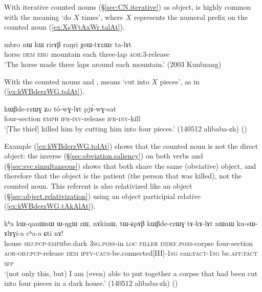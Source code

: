 With iterative counted nouns (§\ref{sec:CN.iterative}) as object,  is highly common with the meaning `do $X$ times', where $X$ represents the numeral prefix on the counted noun  (\ref{ex:XsWtAxWr.talAt}).

\begin{exe}
\ex \label{ex:XsWtAxWr.talAt}
\gll mbro nɯ kɯ rirɤβ raŋri χsɯ-tɤxɯr ta-lɤt \\ 
horse \textsc{dem} \textsc{erg} mountain each three-lap \textsc{aor}:3\flobv{}-release \\
\glt `The horse made three laps around each mountain.' (2003 Kunbzang)
\end{exe}

With the counted nouns  and ,  means `cut into $X$ pieces', as in (\ref{ex:kWBderzWG.tolAt}).

\begin{exe}
\ex \label{ex:kWBderzWG.tolAt}
\gll  kɯβde-rzɯɣ ʑo tó-wɣ-lɤt pjɤ́-wɣ-sat \\
four-section \textsc{emph} \textsc{ifr}-\textsc{inv}-release \textsc{ifr}-\textsc{inv}-kill \\
\glt `[The thief] killed him by cutting him into four pieces.' (140512 alibaba-zh)
()
\end{exe}

Example (\ref{ex:kWBderzWG.tolAt}) shows that the counted noun is not the direct object: the inverse (§\ref{sec:obviation.saliency}) on both verbs  and  (§\ref{sec:svc.simultaneous}) shows that both share the same (obviative) object, and therefore that the object is the patient (the person that was killed), not the counted noun. This referent is also relativized like an object (§\ref{sec:object.relativization}) using an object participial relative (\ref{ex:kWBderzWG.tAkAlAt}).

\begin{exe}
\ex \label{ex:kWBderzWG.tAkAlAt}
\gll kʰa kɯ-qanɯ\redp{}nɯ ɯ-ŋgɯ zɯ, nɤkinɯ, tɯ-ɕpɤβ kɯβde-rzɯɣ tɤ-kɤ-lɤt nɯnɯ ku-sɯ-ɤlɤɣi-a cʰa-a ɕti nɤ! \\
house \textsc{sbj}:\textsc{pcp}-\textsc{emph}\redp{}be.dark \textsc{3sg}.\textsc{poss}-in \textsc{loc} \textsc{filler} \textsc{indef}.\textsc{poss}-corpse four-section \textsc{aor}-\textsc{obj}:\textsc{pcp}-release \textsc{dem} \textsc{ipfv}-\textsc{caus}-be.connected[III]-\textsc{1sg} can:\textsc{fact}-\textsc{1sg} be.\textsc{aff}:\textsc{fact} \textsc{sfp} \\
\glt `(not only this, but) I am (even) able to put together a corpse that had been cut into four pieces in a dark house.' (140512 alibaba-zh)
()
\end{exe}

